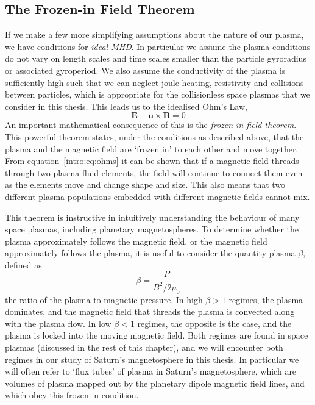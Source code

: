 \subsection{The Frozen-in Field Theorem}\label{intro:sec:frozenin}
If we make a few more simplifying assumptions about the nature of our plasma, we have conditions for \textit{ideal MHD}. In particular we assume the plasma conditions do not vary on length scales and time scales smaller than the particle gyroradius or associated gyroperiod. We also assume the conductivity of the plasma is sufficiently high such that we can neglect joule heating, resistivity and collisions between particles, which is appropriate for the collisionless space plasmas that we consider in this thesis. This leads us to the idealised Ohm's Law,
\begin{equation}\label{intro:eq:ohms}
\boldsymbol{E} + \boldsymbol{u} \times \boldsymbol{B} = 0
\end{equation}
An important mathematical consequence of this is the \textit{frozen-in field theorem}. This powerful theorem states, under the conditions as described above, that the plasma and the magnetic field are `frozen in' to each other and move together. From equation~\ref{intro:eq:ohms} it can be shown that if a magnetic field threads through two plasma fluid elements, the field will continue to connect them even as the elements move and change shape and size. This also means that two different plasma populations embedded with different magnetic fields cannot mix.

This theorem is instructive in intuitively understanding the behaviour of many space plasmas, including planetary magnetospheres. To determine whether the plasma approximately follows the magnetic field, or the magnetic field approximately follows the plasma, it is useful to consider the quantity plasma $\beta$, defined as
\begin{equation}
\beta = \frac{P}{B^2/2\mu_0}
\end{equation}
the ratio of the plasma to magnetic pressure. In high $\beta>1$ regimes, the plasma dominates, and the magnetic field that threads the plasma is convected along with the plasma flow. In low $\beta<1$ regimes, the opposite is the case, and the plasma is locked into the moving magnetic field. Both regimes are found in space plasmas (discussed in the rest of this chapter), and we will encounter both regimes in our study of Saturn's magnetosphere in this thesis. In particular we will often refer to `flux tubes' of plasma in Saturn's magnetosphere, which are volumes of plasma mapped out by the planetary dipole magnetic field lines, and which obey this frozen-in condition.


